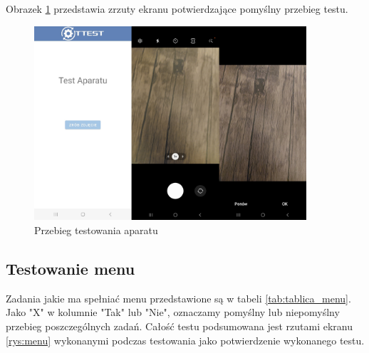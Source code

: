 Obrazek \ref{rys:aparat} przedstawia zrzuty ekranu potwierdzające pomyślny przebieg testu.

\begin{figure}[!hbt]
	\begin{center}
		\includegraphics[angle=360, width=0.90\textwidth]{rys/punkt5/aparat.jpg}
		\caption{Przebieg testowania aparatu}
		\label{rys:aparat}
	\end{center}
\end{figure} 

\newpage


\subsection{Testowanie menu}

Zadania jakie ma spełniać menu przedstawione są w tabeli \ref{tab:tablica_menu}. Jako "X" w kolumnie "Tak" lub "Nie", oznaczamy pomyślny lub niepomyślny przebieg poszczególnych zadań. Całość testu podsumowana jest rzutami ekranu \ref{rys:menu} wykonanymi podczas testowania jako potwierdzenie wykonanego testu.

